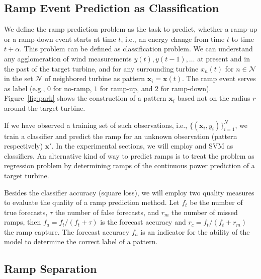 \documentclass[10pt, conference, compsocconf]{IEEEtran}
\begin{document}


\subsection{Ramp Event Prediction as Classification}

We define the ramp prediction problem as the task to predict, whether a ramp-up or a ramp-down event starts at time $t$, i.e., an energy change from time $t$ to time $t+\alpha$. This problem can be defined as classification problem. We can understand any agglomeration of wind measurements $y(t),y(t-1),\ldots$ at present and in the past of the target turbine, and for any surrounding turbine $x_n(t)$ for $n \in \mathcal{N}$ in the set $\mathcal{N}$ of neighbored turbine as pattern $\mathbf{x}_i=\mathbf{x}(t)$. The ramp event serves as label (e.g., $0$ for no-ramp, $1$ for ramp-up, and $2$ for ramp-down). Figure~\ref{fig:park} shows the construction of a pattern $\mathbf{x}_i$ based not on the radius $r$ around the target turbine.

If we have observed a training set of such observations, i.e., $\{ (\mathbf{x}_i, y_i) \}_{i=1}^N$, we train a classifier and predict the ramp for an unknown observation (pattern respectively) $\mathbf{x}'$. In the experimental sections, we will employ and SVM as classifiers. An alternative kind of way to predict ramps is to treat the problem as regression problem by determining ramps of the continuous power prediction of a target turbine.

Besides the classifier accuracy (square loss), we will employ two quality measures to evaluate the quality of a ramp prediction method. Let $f_t$ be the number of true forecasts, $\tau$ the number of false forecasts, and $r_m$ the number of missed ramps, then $f_a = f_t/(f_t+\tau)$ is the forecast accuracy and $r_c = f_t/(f_t+r_m)$ the ramp capture. The forecast accuracy $f_a$ is an indicator for the ability of the model to determine the correct label of a pattern.


\subsection{Ramp Separation}
\end{document}
